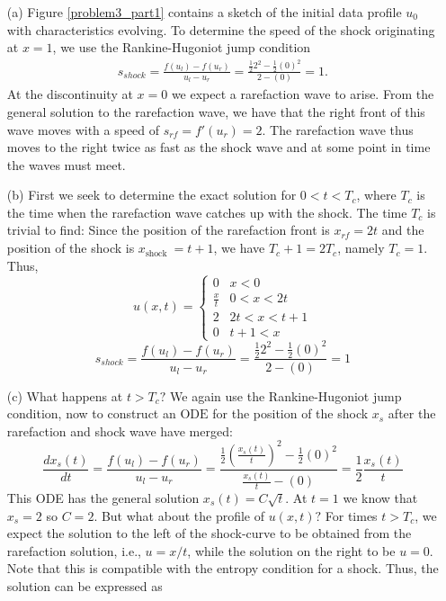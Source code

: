 \documentclass[10pt,letterpaper]{article}
\theoremstyle{break}
\begin{document}
\begin{solution}
    \begin{itemize}
        \item[(a)]
        Figure \ref{problem3_part1} contains a sketch of the initial data profile
        $u_0$ with characteristics evolving. To determine
        the speed of the shock originating at $x = 1$, we use the Rankine-Hugoniot jump condition
        \begin{gather}
            s_{shock}=\frac{f\left(u_{l}\right)-f\left(u_{r}\right)}{u_{l}-u_{r}}=\frac{\frac{1}{2} 2^{2}-\frac{1}{2}(0)^{2}}{2-(0)}=1.
        \end{gather}
        At the discontinuity at $x = 0$ we expect a rarefaction wave to arise. 
        From the general solution to the rarefaction wave, we have that the
        right front of this wave moves with a speed of $s_{rf} = f'(u_r) = 2$.
        The rarefaction wave thus moves to the right twice as fast as the
        shock wave and at some point in time the waves must meet.
        \item[(b)]
        First we seek to determine the exact solution for $0<t<T_{c}$, where $T_{c}$ is the time when the rarefaction wave catches up with the shock. The time $T_{c}$ is trivial to find: Since the position of the rarefaction front is $x_{r f}=2 t$ and the position of the shock is $x_{\text {shock }}=t+1$, we have $T_{c}+1=2 T_{c}$, namely $T_{c}=1 .$ Thus,
        $$
        u(x, t)=\left\{\begin{array}{ll}
        0 & x<0 \\
        \frac{x}{t} & 0<x<2 t \\
        2 & 2 t<x<t+1 \\
        0 & t+1<x
        \end{array}\right.
        $$
        $$
        s_{s h o c k}=\frac{f\left(u_{l}\right)-f\left(u_{r}\right)}{u_{l}-u_{r}}=\frac{\frac{1}{2} 2^{2}-\frac{1}{2}(0)^{2}}{2-(0)}=1
        $$
        \item[(c)]
        What happens at $t>T_{c} ?$ We again use the Rankine-Hugoniot jump condition, now to construct an $\mathrm{ODE}$ for the position of the shock $x_{s}$ after the rarefaction and shock wave have merged:
        $$
        \frac{d x_{s}(t)}{d t}=\frac{f\left(u_{l}\right)-f\left(u_{r}\right)}{u_{l}-u_{r}}=\frac{\frac{1}{2}\left(\frac{x_{s}(t)}{t}\right)^{2}-\frac{1}{2}(0)^{2}}{\frac{x_{s}(t)}{t}-(0)}=\frac{1}{2} \frac{x_{s}(t)}{t}
        $$
        This ODE has the general solution $x_{s}(t)=C \sqrt{t}$. At $t=1$ we know that $x_{s}=2$ so $C=2$. But what about the profile of $u(x, t) ?$ For times $t>T_{c}$, we expect the solution to the left of the shock-curve to be obtained from the rarefaction solution, i.e., $u=x / t$, while the solution on the right to be $u=0$. Note that this is compatible with the entropy condition for a shock. Thus, the solution can be expressed as

\end{itemize}
\end{solution}
\end{document}
